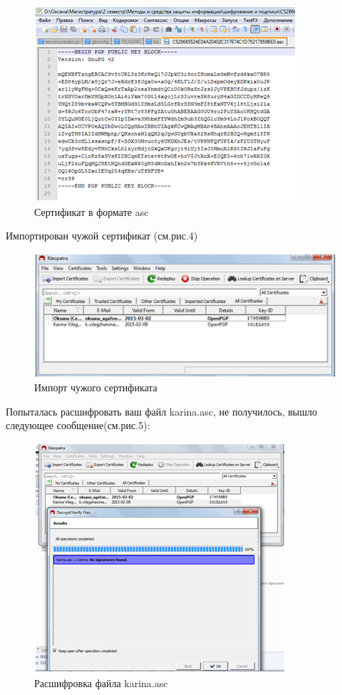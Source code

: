 \documentclass[10pt,a4paper]{article}
\begin{document}
\begin{figure}[h!]
\centering
\includegraphics[scale=0.67]{res/Sertifikat}
\caption{Сертификат в формате asc}
\end{figure}

\hspace{0,6cm}Импортирован чужой сертификат (см.рис.4)

\begin{figure}[h!]
\centering
\includegraphics[scale=0.67]{res/Sertifikat2}
\caption{Импорт чужого сертификата}
\end{figure}

\hspace{0,6cm} Попыталась расшифровать ваш файл karina.asc, не получилось, вышло следующее сообщение(см.рис.5):

\begin{figure}[h!]
\centering
\includegraphics[scale=0.67]{res/Rasshifr}
\caption{Расшифровка файла karina.asc}
\end{figure}
\end{document}
